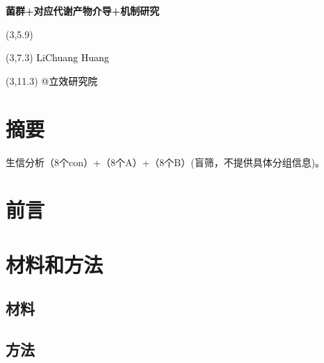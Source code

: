 \documentclass[
]{article}
\author{}
\date{\vspace{-2.5em}}
\begin{document}
\begin{titlepage} 
\begin{center} \textbf{\Huge
菌群+对应代谢产物介导+机制研究} \vspace{4em}
\begin{textblock}{10}(3,5.9) \huge
\textbf{\textcolor{white}{2024-01-12}}
\end{textblock} \begin{textblock}{10}(3,7.3)
\Large \textcolor{black}{LiChuang Huang}
\end{textblock} \begin{textblock}{10}(3,11.3)
\Large \textcolor{black}{@立效研究院}
\end{textblock} \end{center} \end{titlepage}
\restoregeometry


\tableofcontents

\listoffigures

\listoftables

\newpage


\hypertarget{abstract}{%
\section{摘要}\label{abstract}}

生信分析（8个con）+（8个A）+（8个B）(盲筛，不提供具体分组信息)。

\hypertarget{introduction}{%
\section{前言}\label{introduction}}

\hypertarget{methods}{%
\section{材料和方法}\label{methods}}

\hypertarget{ux6750ux6599}{%
\subsection{材料}\label{ux6750ux6599}}

\hypertarget{ux65b9ux6cd5}{%
\subsection{方法}\label{ux65b9ux6cd5}}
\end{document}
